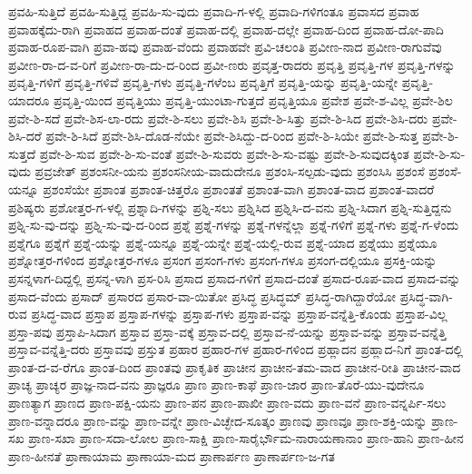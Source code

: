 ಪ್ರವಹಿ-ಸುತ್ತಿದೆ
ಪ್ರವಹಿ-ಸುತ್ತಿದ್ದ
ಪ್ರವಹಿ-ಸು-ವುದು
ಪ್ರವಾದಿ-ಗ-ಳಲ್ಲಿ
ಪ್ರವಾದಿ-ಗಳಿಗಂತೂ
ಪ್ರವಾಸದ
ಪ್ರವಾಹ
ಪ್ರವಾಹಕ್ಕೆದು-ರಾಗಿ
ಪ್ರವಾಹದ
ಪ್ರವಾಹ-ದಂತೆ
ಪ್ರವಾಹ-ದಲ್ಲಿ
ಪ್ರವಾಹ-ದಲ್ಲೇ
ಪ್ರವಾಹ-ದಿಂದ
ಪ್ರವಾಹ-ದೋ-ಪಾದಿ
ಪ್ರವಾಹ-ರೂಪ-ವಾಗಿ
ಪ್ರವಾ-ಹವು
ಪ್ರವಾಹ-ವೆಂದು
ಪ್ರವಾಹವೇ
ಪ್ರವಿ-ಚಲಂತಿ
ಪ್ರವೀಣ-ನಾದ
ಪ್ರವೀಣ-ರಾಗುವೆವು
ಪ್ರವೀಣ-ರಾ-ದ-ವ-ರಿಗೆ
ಪ್ರವೀಣ-ರಾ-ದು-ದ-ರಿಂದ
ಪ್ರವೀ-ಣರು
ಪ್ರವೃತ್ತ-ರಾದರು
ಪ್ರವೃತ್ತಿ
ಪ್ರವೃತ್ತಿ-ಗಳ
ಪ್ರವೃತ್ತಿ-ಗಳನ್ನು
ಪ್ರವೃತ್ತಿ-ಗಳಿಗೆ
ಪ್ರವೃತ್ತಿ-ಗಳಿವೆ
ಪ್ರವೃತ್ತಿ-ಗಳು
ಪ್ರವೃತ್ತಿ-ಗಳೆಂಬ
ಪ್ರವೃತ್ತಿಗೆ
ಪ್ರವೃತ್ತಿ-ಯನ್ನು
ಪ್ರವೃತ್ತಿ-ಯನ್ನೇ
ಪ್ರವೃತ್ತಿ-ಯಾದರೂ
ಪ್ರವೃತ್ತಿ-ಯಿಂದ
ಪ್ರವೃತ್ತಿಯು
ಪ್ರವೃತ್ತಿ-ಯುಂಟಾ-ಗುತ್ತದೆ
ಪ್ರವೃತ್ತಿಯೂ
ಪ್ರವೇಶ
ಪ್ರವೇ-ಶ-ವಿಲ್ಲ
ಪ್ರವೇ-ಶಿಲ
ಪ್ರವೇ-ಶಿ-ಸದೆ
ಪ್ರವೇ-ಶಿಸ-ಲಾ-ರದು
ಪ್ರವೇ-ಶಿ-ಸಲು
ಪ್ರವೇ-ಶಿಸಿ
ಪ್ರವೇ-ಶಿ-ಸಿತ್ತು
ಪ್ರವೇ-ಶಿ-ಸಿದ
ಪ್ರವೇ-ಶಿಸಿ-ದರು
ಪ್ರವೇ-ಶಿಸಿ-ದರೆ
ಪ್ರವೇ-ಶಿ-ಸಿದೆ
ಪ್ರವೇ-ಶಿಸಿ-ದೊಡ-ನೆಯೇ
ಪ್ರವೇ-ಶಿಸಿದ್ದು-ದ-ರಿಂದ
ಪ್ರವೇ-ಶಿ-ಸಿಯೇ
ಪ್ರವೇ-ಶಿ-ಸುತ್ತ
ಪ್ರವೇ-ಶಿ-ಸುತ್ತದೆ
ಪ್ರವೇ-ಶಿ-ಸುವ
ಪ್ರವೇ-ಶಿ-ಸು-ವಂತೆ
ಪ್ರವೇ-ಶಿ-ಸುವರು
ಪ್ರವೇ-ಶಿ-ಸು-ವಷ್ಟು
ಪ್ರವೇ-ಶಿ-ಸುವುದಕ್ಕಿಂತ
ಪ್ರವೇ-ಶಿ-ಸು-ವುದು
ಪ್ರವ್ರಜೇತ್
ಪ್ರಶಂಸನೀ-ಯನು
ಪ್ರಶಂಸನೀಯ-ವಾದುದೇನೂ
ಪ್ರಶಂಸಿ-ಸಲ್ಪಡು-ವುದು
ಪ್ರಶಂಸಿಸಿ
ಪ್ರಶಂಸೆ
ಪ್ರಶಂಸೆ-ಯನ್ನೂ
ಪ್ರಶಂಸೆಯೇ
ಪ್ರಶಾಂತ
ಪ್ರಶಾಂತ-ಚಿತ್ತರೊ
ಪ್ರಶಾಂತತೆ
ಪ್ರಶಾಂತ-ವಾಗಿ
ಪ್ರಶಾಂತ-ವಾದ
ಪ್ರಶಾಂತ-ವಾದರೆ
ಪ್ರಶಿಷ್ಯರು
ಪ್ರಶೋತ್ತರ-ಗ-ಳಲ್ಲಿ
ಪ್ರಶ್ನಾದಿ-ಗಳನ್ನು
ಪ್ರಶ್ನಿ-ಸಲು
ಪ್ರಶ್ನಿಸಿದ
ಪ್ರಶ್ನಿಸಿ-ದ-ವನು
ಪ್ರಶ್ನಿ-ಸಿದಾಗ
ಪ್ರಶ್ನಿ-ಸುತ್ತಿದ್ದನು
ಪ್ರಶ್ನಿ-ಸು-ವು-ದನ್ನು
ಪ್ರಶ್ನಿ-ಸು-ವು-ದ-ರಿಂದ
ಪ್ರಶ್ನೆ
ಪ್ರಶ್ನೆ-ಗಳನ್ನು
ಪ್ರಶ್ನೆ-ಗಳನ್ನೆಲ್ಲಾ
ಪ್ರಶ್ನೆ-ಗಳಿಗೆ
ಪ್ರಶ್ನೆ-ಗಳು
ಪ್ರಶ್ನೆ-ಗ-ಳೆಂದು
ಪ್ರಶ್ನೆಗೂ
ಪ್ರಶ್ನೆಗೆ
ಪ್ರಶ್ನೆ-ಯನ್ನು
ಪ್ರಶ್ನೆ-ಯನ್ನೂ
ಪ್ರಶ್ನೆ-ಯನ್ನೇ
ಪ್ರಶ್ನೆ-ಯಲ್ಲಿ-ರುವ
ಪ್ರಶ್ನೆ-ಯಾದ
ಪ್ರಶ್ನೆಯು
ಪ್ರಶ್ನೆಯೂ
ಪ್ರಶ್ನೋತ್ತರ-ಗಳಿಂದ
ಪ್ರಶ್ನೋತ್ತರ-ಗಳೂ
ಪ್ರಸಂಗ
ಪ್ರಸಂಗ-ಗಳು
ಪ್ರಸಂಗ-ಗಳೂ
ಪ್ರಸಂಗ-ದಲ್ಲಿಯೂ
ಪ್ರಸಕ್ತಿ-ಯನ್ನು
ಪ್ರಸನ್ನಳಾಗ-ದಿದ್ದಲ್ಲಿ
ಪ್ರಸನ್ನ-ಳಾಗಿ
ಪ್ರಸ-ರಿಸಿ
ಪ್ರಸಾದ
ಪ್ರಸಾದ-ಗಳಿಗೆ
ಪ್ರಸಾದ-ದಂತೆ
ಪ್ರಸಾದ-ರೂಪ-ವಾದ
ಪ್ರಸಾದ-ವನ್ನು
ಪ್ರಸಾದ-ವೆಂದು
ಪ್ರಸಾದ್
ಪ್ರಸಾರದ
ಪ್ರಸಾರ-ವಾ-ಯಿತೋ
ಪ್ರಸಿದ್ಧ
ಪ್ರಸಿದ್ಧಮ್
ಪ್ರಸಿದ್ಧ-ರಾಗಿದ್ದಾರೆಯೋ
ಪ್ರಸಿದ್ಧ-ವಾಗಿ-ರುವ
ಪ್ರಸಿದ್ಧ-ವಾದ
ಪ್ರಸ್ತಾಪ
ಪ್ರಸ್ತಾಪ-ಗಳನ್ನು
ಪ್ರಸ್ತಾಪ-ಗಳು
ಪ್ರಸ್ತಾಪ-ವನ್ನು
ಪ್ರಸ್ತಾಪ-ವನ್ನೆತ್ತಿ-ಕೊಂಡು
ಪ್ರಸ್ತಾಪ-ವಿಲ್ಲ
ಪ್ರಸ್ತಾ-ಪವು
ಪ್ರಸ್ತಾಪಿ-ಸಿದಾಗ
ಪ್ರಸ್ತಾವ
ಪ್ರಸ್ತಾ-ವಕ್ಕೆ
ಪ್ರಸ್ತಾವ-ದಲ್ಲಿ
ಪ್ರಸ್ತಾವ-ನೆ-ಯನ್ನು
ಪ್ರಸ್ತಾವ-ವನ್ನು
ಪ್ರಸ್ತಾವ-ವನ್ನೆತ್ತಿ
ಪ್ರಸ್ತಾವ-ವನ್ನೆತ್ತಿ-ದರು
ಪ್ರಸ್ತಾವವು
ಪ್ರಸ್ತುತ
ಪ್ರಹಾರ
ಪ್ರಹಾರ-ಗಳ
ಪ್ರಹಾರ-ಗಳಿಂದ
ಪ್ರಹ್ಲಾದನ
ಪ್ರಹ್ಲಾದ-ನಿಗೆ
ಪ್ರಾಂತ-ದಲ್ಲಿ
ಪ್ರಾಂತ-ದ-ವ-ರೆಗೂ
ಪ್ರಾಂತ-ದಿಂದ
ಪ್ರಾಂತವು
ಪ್ರಾಕೃತಿಕ
ಪ್ರಾಚೀನ
ಪ್ರಾಚೀನ-ತಮ-ವಾದ
ಪ್ರಾಚೀನ-ರೀತಿ
ಪ್ರಾಚೀನ-ವಾದ
ಪ್ರಾಚ್ಯ
ಪ್ರಾಚ್ಯರ
ಪ್ರಾಜ್ಞ-ನಾದ-ವನು
ಪ್ರಾಜ್ಞರೂ
ಪ್ರಾಣ
ಪ್ರಾಣ-ಕಾಫೆ
ಪ್ರಾಣ-ಜಾರ
ಪ್ರಾಣ-ತೊರೆ-ಯು-ವುದೇನೂ
ಪ್ರಾಣತ್ಯಾಗ
ಪ್ರಾಣದ
ಪ್ರಾಣ-ಪಕ್ಷಿ-ಯನು
ಪ್ರಾಣ-ಪನ
ಪ್ರಾಣ-ಪಾಖೀ
ಪ್ರಾಣ-ವದು
ಪ್ರಾಣ-ವನೆ
ಪ್ರಾಣ-ವನ್ನರ್ಪಿ-ಸಲು
ಪ್ರಾಣ-ವನ್ನಾದರೂ
ಪ್ರಾಣ-ವನ್ನು
ಪ್ರಾಣ-ವನ್ನೇ
ಪ್ರಾಣ-ವಿಚ್ಛೇದ-ಸೂತ್ಕಂ
ಪ್ರಾಣವು
ಪ್ರಾಣವೂ
ಪ್ರಾಣ-ಶಕ್ತಿ-ಯನ್ನು
ಪ್ರಾಣ-ಸಖ
ಪ್ರಾಣ-ಸಖಾ
ಪ್ರಾಣ-ಸದಾ-ಲೋಲ
ಪ್ರಾಣ-ಸಾಕ್ಷಿ
ಪ್ರಾಣ-ಸಾರೈರ್ಭೌಮ-ನಾರಾಯಣಾನಾಂ
ಪ್ರಾಣ-ಹಾನಿ
ಪ್ರಾಣ-ಹೀನ
ಪ್ರಾಣ-ಹೀನತೆ
ಪ್ರಾಣಾಯಾಮ
ಪ್ರಾಣಾಯಾ-ಮದ
ಪ್ರಾಣಾರ್ಪಣ
ಪ್ರಾಣಾರ್ಪಣ-ಜ-ಗತ
